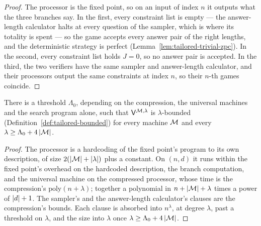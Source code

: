 \begin{proof}
\leanok
The processor is the fixed point, so on an input of index $n$ it outputs what the three
branches say. In the first, every constraint list is empty --- the answer-length calculator
halts at every question of the sampler, which is where its totality is spent --- so the game
accepts every answer pair of the right lengths, and the deterministic strategy is perfect
(Lemma~\ref{lem:tailored-trivial-zpc}). In the second, every constraint list holds $J = 0$, so
no answer pair is accepted. In the third, the two verifiers have the same sampler and
answer-length calculator, and their processors output the same constraints at index $n$, so
their $n$-th games coincide.
\end{proof}

\begin{lemma}
\label{lem:tailored-lambda}
\leanok
There is a threshold $\Lambda_0$, depending on the compression, the universal machines and the
search program alone, such that $\mathsf{V}^{\mathcal{M},\lambda}$ is $\lambda$-bounded
(Definition~\ref{def:tailored-bounded}) for every machine $\mathcal{M}$ and every
$\lambda \geq \Lambda_0 + 4\left\vert {\mathcal{M}} \right\vert$.
\end{lemma}

\begin{proof}
\leanok
The processor is a hardcoding of the fixed point's program to its own description, of size
$2(\left\vert {\mathcal{M}} \right\vert + \left\vert {\lambda} \right\vert)$ plus a constant. On $(n, d)$ it runs within the fixed point's
overhead on the hardcoded description, the branch computation, and the universal machine on the
compressed processor, whose time is the compression's $\mathrm{poly}(n + \lambda)$; together a
polynomial in $n + \left\vert {\mathcal{M}} \right\vert + \lambda$ times a power of $\left\vert {d} \right\vert + 1$. The sampler's and the
answer-length calculator's clauses are the compression's bounds. Each clause is absorbed into
$n^\lambda$, at degree $\lambda$, past a threshold on $\lambda$, and the size into $\lambda$ once
$\lambda \geq \Lambda_0 + 4\left\vert {\mathcal{M}} \right\vert$.
\end{proof}

